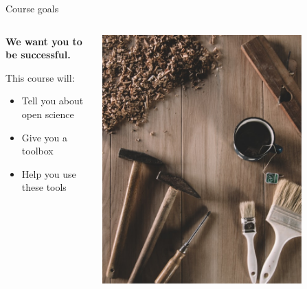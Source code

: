 
\begin{frame}{Course goals}

\begin{columns}[t]
    \begin{column}{.45\textwidth}

    \textbf{We want you to be successful.}
    \vspace{3ex}
    

    This course will:
    \begin{itemize}
        \item Tell you about open science
        \item Give you a toolbox
        \item Help you use these tools
    \end{itemize}
    
    \end{column}

    \begin{column}{.45\textwidth}

        \centering
        \includegraphics[width=0.8\textwidth]{images/milan-popovic-BmyXTxyDL-I-unsplash.jpg}
    
    
    \end{column}

\end{columns}


\end{frame}

